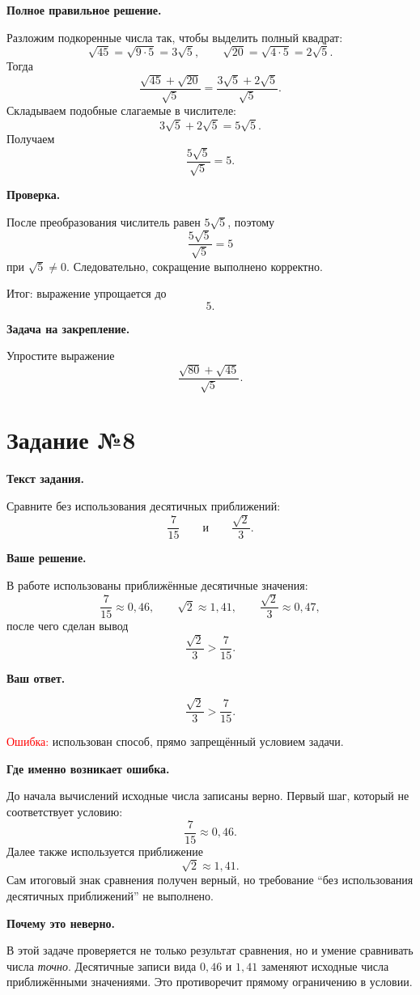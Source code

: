 \documentclass[12pt,a4paper]{article}
\begin{document}
\textbf{Полное правильное решение.}

Разложим подкоренные числа так, чтобы выделить полный квадрат:
\[
\sqrt{45}=\sqrt{9\cdot5}=3\sqrt5,
\qquad
\sqrt{20}=\sqrt{4\cdot5}=2\sqrt5.
\]
Тогда
\[
\frac{\sqrt{45}+\sqrt{20}}{\sqrt5}
=
\frac{3\sqrt5+2\sqrt5}{\sqrt5}.
\]
Складываем подобные слагаемые в числителе:
\[
3\sqrt5+2\sqrt5=5\sqrt5.
\]
Получаем
\[
\frac{5\sqrt5}{\sqrt5}=5.
\]

\textbf{Проверка.}

После преобразования числитель равен $5\sqrt5$, поэтому
\[
\frac{5\sqrt5}{\sqrt5}=5
\]
при $\sqrt5\neq0$. Следовательно, сокращение выполнено корректно.

\textcolor{teal!60!black}{Итог:} выражение упрощается до
\[
\boxed{5}.
\]

\textbf{Задача на закрепление.}

Упростите выражение
\[
\frac{\sqrt{80}+\sqrt{45}}{\sqrt5}.
\]

\newpage
{}
\label{task:8}
\section*{Задание №8}

\textbf{Текст задания.}

Сравните без использования десятичных приближений:
\[
\frac7{15}
\qquad\text{и}\qquad
\frac{\sqrt2}{3}.
\]

\textbf{Ваше решение.}

В работе использованы приближённые десятичные значения:
\[
\frac7{15}\approx0{,}46,
\qquad
\sqrt2\approx1{,}41,
\qquad
\frac{\sqrt2}{3}\approx0{,}47,
\]
после чего сделан вывод
\[
\frac{\sqrt2}{3}>\frac7{15}.
\]

\textbf{Ваш ответ.}

\[
\frac{\sqrt2}{3}>\frac7{15}.
\]

\textcolor{red}{Ошибка:} использован способ, прямо запрещённый условием задачи.

\textbf{Где именно возникает ошибка.}

До начала вычислений исходные числа записаны верно. Первый шаг, который не соответствует условию:
\[
\frac7{15}\approx0{,}46.
\]
Далее также используется приближение
\[
\sqrt2\approx1{,}41.
\]
Сам итоговый знак сравнения получен верный, но требование ``без использования десятичных приближений'' не выполнено.

\textbf{Почему это неверно.}

В этой задаче проверяется не только результат сравнения, но и умение сравнивать числа \emph{точно}. Десятичные записи вида $0{,}46$ и $1{,}41$ заменяют исходные числа приближёнными значениями. Это противоречит прямому ограничению в условии.
\end{document}
